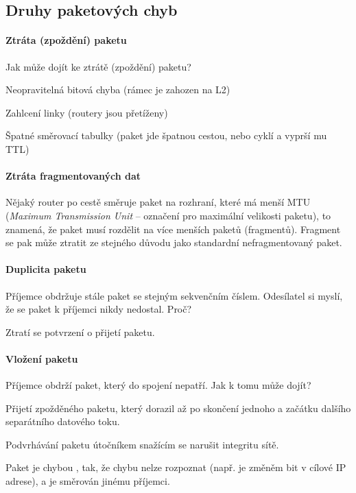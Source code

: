\subsection*{Druhy paketových chyb}

\paragraph*{Ztráta (zpoždění) paketu} Jak může dojít ke ztrátě (zpoždění) paketu? \begin{compactitem}
    \item Neopravitelná bitová chyba (rámec je zahozen na L2)
    \item Zahlcení linky (routery jsou přetíženy)
    \item Špatné směrovací tabulky (paket jde špatnou cestou, nebo cyklí a vyprší mu TTL)
\end{compactitem}

\paragraph*{Ztráta fragmentovaných dat} Nějaký router po cestě směruje paket na rozhraní, které má menší MTU (\textit{Maximum Transmission Unit} -- označení pro maximální velikosti paketu), to znamená, že paket musí rozdělit na více menších paketů (fragmentů). Fragment se pak může ztratit ze stejného důvodu jako standardní nefragmentovaný paket.

\paragraph*{Duplicita paketu} Příjemce obdržuje stále paket se stejným sekvenčním číslem. Odesílatel si myslí, že se paket k příjemci nikdy nedostal. Proč? \begin{compactitem}
    \item Ztratí se potvrzení o přijetí paketu.
\end{compactitem}

\paragraph*{Vložení paketu} Příjemce obdrží paket, který do spojení nepatří. Jak k tomu může dojít? \begin{compactitem}
    \item Přijetí zpožděného paketu, který dorazil až po skončení jednoho a začátku dalšího separátního datového toku.
    \item Podvrhávání paketu útočníkem snažícím se narušit integritu sítě.
    \item Paket je chybou , tak, že chybu nelze rozpoznat (např. je změněm bit v cílové IP adrese), a je směrován jinému příjemci.
\end{compactitem}

